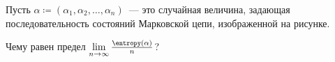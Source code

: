 Пусть $\alpha \coloneqq (\alpha_1, \alpha_2, \dots, \alpha_n)$~--- это случайная величина, задающая
последовательность состояний Марковской цепи, изображенной на рисунке.

Чему равен предел $\lim\limits_{n \to \infty} \frac{\entropy(\alpha)}{n}$?
